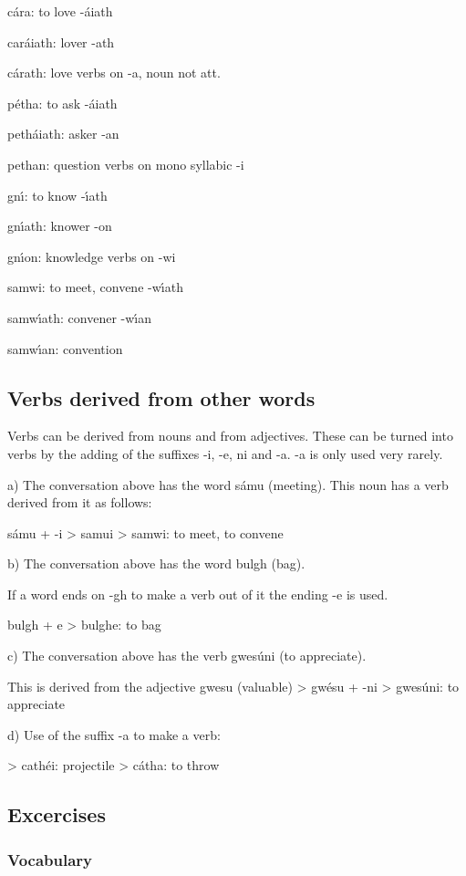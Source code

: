 c\'{a}ra: to love
	-\'{a}iath

car\'{a}iath: lover
	-ath

c\'{a}rath: love
verbs on -a, noun not att.

p\'{e}tha: to ask
	-\'{a}iath

peth\'{a}iath: asker
	-an

pethan: question
verbs on mono syllabic -i

gn\'{\i}: to know
	-\'{\i}ath

gn\'{\i}ath: knower
	-on

gn\'{\i}on: knowledge
verbs on -wi

samwi: to meet, convene
	-w\'{\i}ath

samw\'{\i}ath: convener
	-w\'{\i}an

samw\'{\i}an: convention

\subsection{Verbs derived from other words}

Verbs can be derived from nouns and from adjectives. These can be turned into verbs by the adding of the suffixes -i, -e, ni and -a. -a is only used very rarely.

a) The conversation above has the word s\'{a}mu (meeting).
This noun has a verb derived from it as follows:

s\'{a}mu + -i > samui > samwi: to meet, to convene

b) The conversation above has the word bulgh (bag).

If a word ends on -gh to make a verb out of it the ending -e is used.

bulgh + e > bulghe: to bag

c) The conversation above has the verb gwes\'{u}ni (to appreciate).

This is derived from the adjective gwesu (valuable)
> gw\'{e}su + -ni > gwes\'{u}ni: to appreciate

d) Use of the suffix -a to make a verb:

> cath\'{e}i: projectile
> c\'{a}tha: to throw

\subsection{Excercises}

\subsubsection{Vocabulary}

